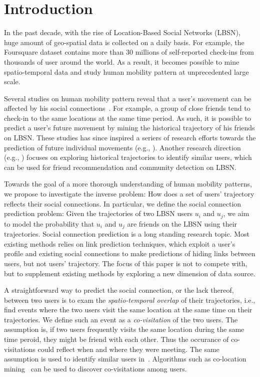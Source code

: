 \section{Introduction}\label{sec:intro}

In the past decade, with the rise of Location-Based Social Networks (LBSN), huge amount of geo-spatial data is collected on a daily basis. For example, the Foursquare\cite{yang2015nationtelescope} dataset contains more than 30 millions of self-reported check-ins from thousands of user around the world. As a result, it becomes possible to mine spatio-temporal data and study human mobility pattern at unprecedented large scale.

Several studies on human mobility pattern reveal that a user's movement can be affected by his social connections~\cite{cho2011friendship, ye2013s}. For example, a group of close friends tend to check-in to the same locations at the same time period. As such, it is possible to predict a user's future movement by mining the historical trajectory of his friends on LBSN. These studies has since inspired a seriers of research efforts towards the prediction of future individual movements (e.g., \cite{noulas2012mining, gao2012mobile, scellato2011nextplace, lian2013collaborative}). Another research direction (e.g., \cite{xiao2010finding}) focuses on exploring historical trajectories to identify similar users, which can be used for friend recommendation and community detection on LBSN. 


Towards the goal of a more thorough understanding of human mobility patterns, we propose to investigate the inverse problem:  How does a set of users' trajectory reflects their social connections. In particular, we define the social connection prediction problem: Given the trajectories of two LBSN users $u_i$ and $u_j$, we aim to model the probability that $u_i$ and $u_j$ are friends on the LBSN using their trajectories. Social connection prediction is a long standing research topic. Most existing methods relies on link prediction techniques, which exploit a user's profile and existing social connections to make predictions of hiding links between users, but not users' trajectory. The focus of this paper is not to compete with, but to supplement existing methods by exploring a new dimension of data source.

A straightforward way to predict the social connection, or the lack thereof, between two users is to exam the \textit{spatio-temporal overlap} of their trajectories, i.e., find events where the two users visit the same location at the same time on their trajectories. We define such an event as a \textit{co-visitation} of the two users. The assumption is, if two users frequently visits the same location during the same time peroid, they might be friend with each other. Thus the occurance of co-visitations could reflect when and where they were meeting. The same assumption is used to identify similar users in~\cite{xiao2010finding}. Algorithms such as co-location mining~\cite{weiler2015geo} can be used to discover co-visitations among users. 


